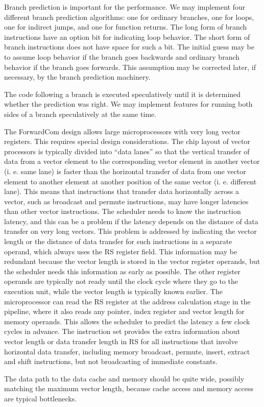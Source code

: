 \documentclass[forwardcom.tex]{subfiles}
\begin{document}
Branch prediction is important for the performance. We may implement four different branch prediction algorithms: one for ordinary branches, one for loops, one for indirect jumps, and one for function returns. The long form of branch instructions have an option bit for indicating loop behavior. The short form of branch instructions does not have space for such a bit. The initial guess may be to assume loop behavior if the branch goes backwards and ordinary branch behavior if the branch goes forwards. This assumption may be corrected later, if necessary, by the branch prediction machinery. 
\vspace{2mm}

The code following a branch is executed speculatively until it is determined whether the prediction was right. We may implement features for running both sides of a branch speculatively at the same time. 
\vspace{2mm}

The ForwardCom design allows large microprocessors with very long vector registers. This requires special design considerations. The chip layout of vector processors is typically divided into ``data lanes'' so that the vertical transfer of data from a vector element to the corresponding 
vector element in another vector (i. e. same lane) is faster than the horizontal transfer of data from one vector element to another element at another position of the same vector (i. e. different lane). This means that instructions that transfer data horizontally across a vector, such as broadcast and permute instructions, may have longer latencies than other vector instructions. The scheduler needs to know the instruction latency, and this can be a problem if the latency depends on the distance of data transfer on very long vectors. This problem is addressed by indicating the vector length or the distance of data transfer for such instructions in a separate operand, which always uses the RS register field. This information may be redundant because the vector length is stored in the vector register operands, but the scheduler needs this information as early as possible. The other register operands are typically not ready until the clock cycle where they go to the execution unit, while the vector length is typically known earlier. The microprocessor can read the RS register at the address calculation stage in the pipeline, where it also reads any pointer, index register and vector length for memory operands. This allows the scheduler to predict the latency a few clock cycles in advance. The instruction set provides the extra information about vector length or data transfer length in RS for all instructions that involve horizontal data transfer, including memory broadcast, permute, insert, extract and shift instructions, but not broadcasting of immediate constants. 
\vspace{2mm}

The data path to the data cache and memory should be quite wide, possibly matching the maximum vector length, because cache access and memory access are typical bottlenecks.
\end{document}
